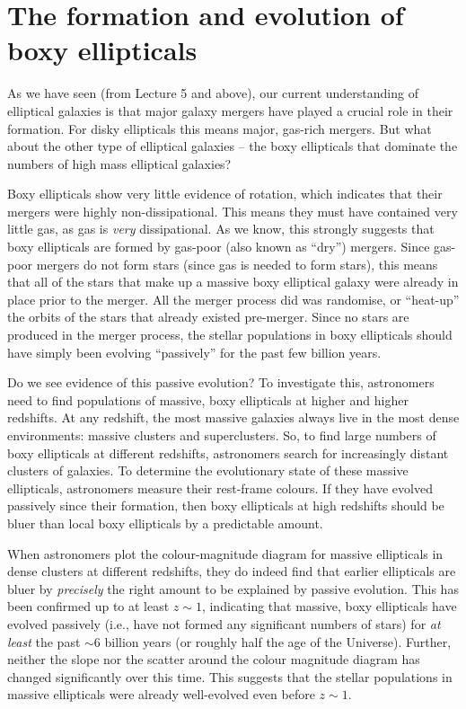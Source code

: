 \documentclass[11pt]{article}
\begin{document}
\section{The formation and evolution of boxy ellipticals}
As we have seen (from Lecture 5 and above), our current understanding
of elliptical galaxies is that major galaxy mergers have played a
crucial role in their formation. For disky ellipticals this means
major, gas-rich mergers. But what about the other type of elliptical
galaxies -- the boxy ellipticals that dominate the numbers of high
mass elliptical galaxies?

Boxy ellipticals show very little evidence of rotation, which
indicates that their mergers were highly non-dissipational. This means
they must have contained very little gas, as gas is {\it very}
dissipational. As we know, this strongly suggests that boxy
ellipticals are formed by gas-poor (also known as ``dry'')
mergers. Since gas-poor mergers do not form stars (since gas is needed
to form stars), this means that all of the stars that make up a
massive boxy elliptical galaxy were already in place prior to the
merger. All the merger process did was randomise, or ``heat-up'' the
orbits of the stars that already existed pre-merger. Since no stars
are produced in the merger process, the stellar populations in boxy
ellipticals should have simply been evolving ``passively'' for the
past few billion years.

Do we see evidence of this passive evolution? To investigate this,
astronomers need to find populations of massive, boxy ellipticals at
higher and higher redshifts. At any redshift, the most massive
galaxies always live in the most dense environments: massive clusters
and superclusters. So, to find large numbers of boxy ellipticals at
different redshifts, astronomers search for increasingly distant
clusters of galaxies. To determine the evolutionary state of these
massive ellipticals, astronomers measure their rest-frame colours. If
they have evolved passively since their formation, then boxy
ellipticals at high redshifts should be bluer than local boxy
ellipticals by a predictable amount.

When astronomers plot the colour-magnitude diagram for massive
ellipticals in dense clusters at different redshifts, they do indeed
find that earlier ellipticals are bluer by {\it precisely} the right
amount to be explained by passive evolution. This has been confirmed
up to at least $z\sim1$, indicating that massive, boxy ellipticals have
evolved passively (i.e., have not formed any significant numbers of
stars) for {\it at least} the past $\sim$6 billion years (or roughly
half the age of the Universe). Further, neither the slope nor the
scatter around the colour magnitude diagram has changed significantly
over this time. This suggests that the stellar populations in massive
ellipticals were already well-evolved even before $z\sim1$.
\end{document}
